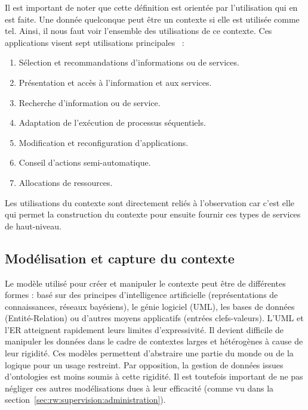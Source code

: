 Il est important de noter que cette définition est orientée par l'utilisation qui en est faite. Une donnée quelconque peut être un contexte si elle est utilisée comme tel. Ainsi, il nous faut voir l'ensemble des utilisations de ce contexte. Ces applications visent sept utilisations principales~\cite{Soylu:context} : 
\begin{enumerate}
	\item Sélection et recommandations d'informations ou de services.
	\item Présentation et accès à l'information et aux services.
	\item Recherche d'information ou de service.
	\item Adaptation de l'exécution de processus séquentiels.
	\item Modification et reconfiguration d'applications.
	\item Conseil d'actions semi-automatique.
	\item Allocations de ressources.
\end{enumerate}
Les utilisations du contexte sont directement reliés à l'observation car c'est elle qui permet la construction du contexte pour ensuite fournir ces types de services de haut-niveau.

\subsection{Modélisation et capture du contexte}
Le modèle utilisé pour créer et manipuler le contexte peut être de différentes formes : basé sur des principes d'intelligence artificielle (représentations de connaissances, réseaux bayésiens), le génie logiciel (UML), les bases de données (Entité-Relation) ou d'autres moyens applicatifs (entrées clefs-valeurs). L'UML et l'ER atteignent rapidement leurs limites d'expressivité. Il devient difficile de manipuler les données dans le cadre de contextes larges et hétérogènes à cause de leur rigidité. Ces modèles permettent d'abstraire une partie du monde ou de la logique pour un usage restreint. Par opposition, la gestion de données issues d'ontologies est moins soumis à cette rigidité. Il est toutefois important de ne pas négliger ces autres modélisations dues à leur efficacité (comme vu dans la section~\ref{sec:rw:supervision:administration}).


